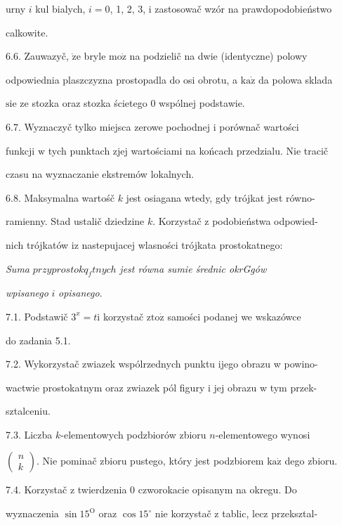 \documentclass[a4paper,12pt]{article}
\begin{document}
urny $i$ kul bialych, $i=0$, 1, 2, 3, $\mathrm{i}$ zastosowač wzór na prawdopodobieństwo

calkowite.

6.6. Zauwazyč, $\dot{\mathrm{z}}\mathrm{e}$ bryle $\mathrm{m}\mathrm{o}\dot{\mathrm{z}}$ na podzielič na dwie (identyczne) polowy

odpowiednia plaszczyzna prostopadla do osi obrotu, a $\mathrm{k}\mathrm{a}\dot{\mathrm{z}}$ da polowa sklada

$\mathrm{s}\mathrm{i}\mathrm{e}$ ze stozka oraz stozka ścietego $0$ wspólnej podstawie.

6.7. Wyznaczyč tylko miejsca zerowe pochodnej $\mathrm{i}$ porównač wartości

funkcji $\mathrm{w}$ tych punktach zjej wartościami na końcach przedzialu. Nie tracič

czasu na wyznaczanie ekstremów lokalnych.

6.8. Maksymalna wartośč $k$ jest osiagana wtedy, gdy trójkat jest równo-

ramienny. Stad ustalič dziedzine $k$. Korzystač $\mathrm{z}$ podobieństwa odpowied-

nich trójkatów $\mathrm{i}\mathrm{z}$ nastepujacej wlasności trójkata prostokatnego:

{\it Suma} $przyprostokq_{f}tnych$ {\it jest równa sumie średnic okrGgów}

{\it wpisanego} $i$ {\it opisanego}.

7.1. Podstawič $3^{x}=t\mathrm{i}$ korzystač $\mathrm{z}\mathrm{t}\mathrm{o}\dot{\mathrm{z}}$ samości podanej we wskazówce

do zadania 5.1.

7.2. Wykorzystač zwiazek wspólrzednych punktu ijego obrazu w powino-

wactwie prostokatnym oraz zwiazek pól figury i jej obrazu w tym przek-

sztalceniu.

7.3. Liczba $k$-elementowych podzbiorów zbioru $n$-elementowego wynosi

$\left(\begin{array}{l}
n\\
k
\end{array}\right)$. Nie pominač zbioru pustego, który jest podzbiorem $\mathrm{k}\mathrm{a}\dot{\mathrm{z}}$ dego zbioru.

7.4. Korzystač $\mathrm{z}$ twierdzenia $0$ czworokacie opisanym na okregu. Do

wyznaczenia $\sin 15^{\mathrm{O}}$ oraz $\cos 15^{\circ}$ nie korzystač $\mathrm{z}$ tablic, lecz przeksztal-
\end{document}
